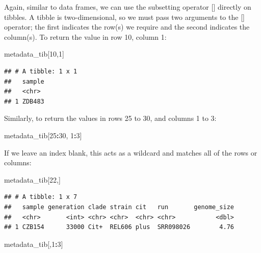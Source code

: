 \documentclass[
]{book}
\newenvironment{Shaded}{\begin{snugshade}}{\end{snugshade}}
\newcommand{\DecValTok}[1]{\textcolor[rgb]{0.00,0.00,0.81}{#1}}
\newcommand{\NormalTok}[1]{#1}
\newcommand{\SpecialCharTok}[1]{\textcolor[rgb]{0.81,0.36,0.00}{\textbf{#1}}}
\begin{document}
Again, similar to data frames, we can use the subsetting operator {[}{]} directly on tibbles. A tibble is two-dimensional, so we must pass two arguments to the {[}{]} operator; the first indicates the row(s) we require and the second indicates the column(s). To return the value in row 10, column 1:

\begin{Shaded}
\begin{Highlighting}[]
\NormalTok{metadata\_tib[}\DecValTok{10}\NormalTok{,}\DecValTok{1}\NormalTok{]}
\end{Highlighting}
\end{Shaded}

\begin{verbatim}
## # A tibble: 1 x 1
##   sample
##   <chr> 
## 1 ZDB483
\end{verbatim}

Similarly, to return the values in rows 25 to 30, and columns 1 to 3:

\begin{Shaded}
\begin{Highlighting}[]
\NormalTok{metadata\_tib[}\DecValTok{25}\SpecialCharTok{:}\DecValTok{30}\NormalTok{, }\DecValTok{1}\SpecialCharTok{:}\DecValTok{3}\NormalTok{]}
\end{Highlighting}
\end{Shaded}

If we leave an index blank, this acts as a wildcard and matches all of the rows or columns:

\begin{Shaded}
\begin{Highlighting}[]
\NormalTok{metadata\_tib[}\DecValTok{22}\NormalTok{,]}
\end{Highlighting}
\end{Shaded}

\begin{verbatim}
## # A tibble: 1 x 7
##   sample generation clade strain cit   run       genome_size
##   <chr>       <int> <chr> <chr>  <chr> <chr>           <dbl>
## 1 CZB154      33000 Cit+  REL606 plus  SRR098026        4.76
\end{verbatim}

\begin{Shaded}
\begin{Highlighting}[]
\NormalTok{metadata\_tib[,}\DecValTok{1}\SpecialCharTok{:}\DecValTok{3}\NormalTok{]}
\end{Highlighting}
\end{Shaded}
\end{document}
